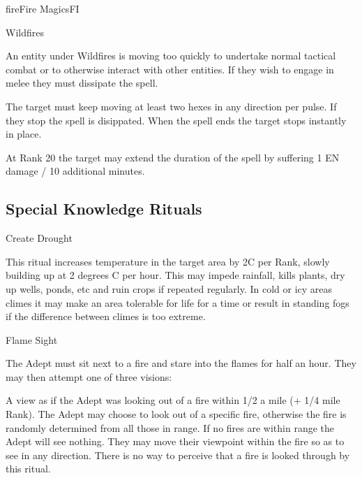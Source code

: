 \begin{college}[2.0]{fire}{Fire Magics}{FI}
\begin{spell}[S-14]{Wildfires}
\begin{effects}
An entity under Wildfires is moving too quickly to undertake normal
tactical combat or to otherwise interact with other entities. If they
wish to engage in melee they must dissipate the spell.

The target must keep moving at least two hexes in any direction per
pulse.  If they stop the spell is disippated. When the spell ends the
target stops instantly in place.

At Rank 20 the target may extend the duration of the spell by
suffering 1 EN damage / 10 additional minutes.
\end{effects}
\end{spell}

\subsection{Special Knowledge Rituals}

\begin{ritual}[R-1]{Create Drought}
\begin{effects}
This ritual increases temperature in the target area by 2C per Rank,
slowly building up at 2 degrees C per hour. This may impede rainfall,
kills plants, dry up wells, ponds, etc and ruin crops if repeated
regularly. In cold or icy areas climes it may make an area tolerable
for life for a time or result in standing fogs if the difference
between climes is too extreme.
\end{effects}
\end{ritual}

\begin{ritual}[R-2]{Flame Sight}
\begin{effects}
The Adept must sit next to a fire and stare into the flames
for half an hour.  They may then attempt one of three visions:

\begin{Itemize}
\item
A view as if the Adept was looking out of a fire within 1/2 a mile (+
1/4 mile Rank). The Adept may choose to look out of a specific fire,
otherwise the fire is randomly determined from all those in range. If
no fires are within range the Adept will see nothing. They may move
their viewpoint within the fire so as to see in any direction. There
is no way to perceive that a fire is looked through by this ritual.


\end{Itemize}
\end{effects}
\end{ritual}
\end{college}

